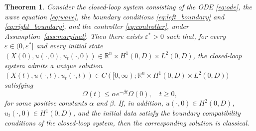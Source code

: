\documentclass{IEEEtran}
\newtheorem{theorem}{Theorem}[section]
\theoremstyle{definition}
\begin{document}
\begin{theorem}
\label{thm1}
Consider the closed-loop system consisting of the ODE \eqref{eq:ode},
the wave equation \eqref{eq:wave}, the boundary conditions
\eqref{eq:left_boundary} and \eqref{eq:right_boundary}, and the controller
\eqref{eq:controller}, under Assumption~\ref{ass:marginal}.
Then there exists $\varepsilon^*>0$ such that, for every
$\varepsilon\in(0,\varepsilon^*]$ and every initial state
$(X(0),u(\cdot,0),u_t(\cdot,0))\in
\mathbb R^n\times H^1(0,D)\times L^2(0,D)$, the closed-loop
system admits a unique solution
$(X(t),u(\cdot,t),u_t(\cdot,t))\in
C([0,\infty);\mathbb R^n\times H^1(0,D)\times L^2(0,D))$
satisfying
\begin{equation}
 \Omega(t)\leq\alpha e^{-\beta t}\Omega(0),\quad t\geq0,
\label{eq:stab}
\end{equation}
for some positive constants $\alpha$ and $\beta$.
If, in addition, $u(\cdot,0)\in H^2(0,D)$,
$u_t(\cdot,0)\in H^1(0,D)$, and the initial data satisfy the
boundary compatibility conditions of the closed-loop system,
then the corresponding solution is classical.
\end{theorem}
\end{document}
